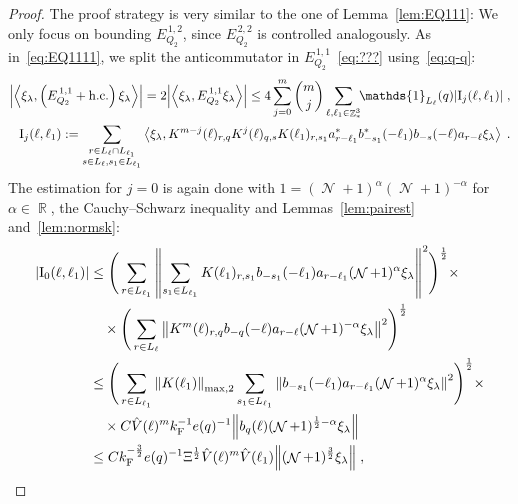 \documentclass[12pt,a4paper]{article}
\numberwithin{equation}{section}
\newcommand{\1}{\mathbb{I}}
\newcommand{\F}{\mathrm{F}}
\newcommand{\I}{\mathrm{I}}
\DeclareMathOperator{\R}{\mathbb{R}}
\DeclareMathOperator{\Z}{\mathbb{Z}}
\DeclareMathOperator{\NN}{\mathcal{N}}
\newcommand{\half}{\frac{1}{2}}
\newcommand{\eva}[1]{\left\langle #1 \right\rangle}
\theoremstyle{plain}
\theoremstyle{definition}
\theoremstyle{remark}
\theoremstyle{plain}
\theoremstyle{definition}
\theoremstyle{remark}
\begin{document}
\begin{proof}
The proof strategy is very similar to the one of Lemma~\ref{lem:EQ111}: We only focus on bounding $ E^{\,1,2}_{Q_2} $, since $ E^{\,2,2}_{Q_2} $ is controlled analogously.
As in~\eqref{eq:EQ1111}, we split the anticommutator in $ E^{\,1,1}_{Q_2} $~\eqref{eq:???} using~\eqref{eq:q-q}:
\begin{equation} \label{eq:EQ2111}
\begin{aligned}
	\abs{\eva{\xi_\lambda,\left(E^{\,1,1}_{Q_2}+\mathrm{h.c.}\right) \xi_\lambda }} 
	= 2\abs{\eva{\xi_\lambda, E^{\,1,1}_{Q_2} \xi_\lambda }}
	\le 4 \sum_{j=0}^m {{m}\choose j} \sum\limits_{\ell,\ell_1  \in \Z^3_*}\!\! \mathds{1}_{L_\ell}(q) |\I_j(\ell, \ell_1)| \;,\\
	\I_j(\ell, \ell_1)
	:= \sum\limits_{\substack{r\in L_{\ell} \cap L_{\ell_1}\\ s \in L_{\ell},s_1\in L_{\ell_1}}}
		\eva{\xi_\lambda, K^{m-j}(\ell)_{r,q} K^{j}(\ell)_{q,s} K(\ell_1)_{r,s_1} a^*_{r-\ell_1} b^*_{-s_1}(-\ell_1) b_{-s}(-\ell) a_{r-\ell} \xi_\lambda} \;. \\
\end{aligned}
\end{equation}
The estimation for $ j = 0 $ is again done with $1 = (\NN+1)^{\alpha}(\NN+1)^{-\alpha}$ for $\alpha \in \R$, the Cauchy--Schwarz inequality and Lemmas~\ref{lem:pairest} and~\ref{lem:normsk}:
\begin{align}
	|\I_0(\ell, \ell_1)|
 	&\leq  \Bigg( \sum\limits_{r \in L_{\ell_1}} \norm{\sum\limits_{s_1 \in L_{\ell_1}} K(\ell_1)_{r,s_1} b_{-s_1}(-\ell_1) a_{r-\ell_1} (\NN+1)^{\alpha}\xi_\lambda}^2\Bigg)^\half \times\nonumber\\
 	&\quad \times \Bigg( \sum\limits_{r \in L_\ell}  \norm{  K^{m}(\ell)_{r,q}  b_{-q}(-\ell) a_{r-\ell} (\NN+1)^{-\alpha}\xi_\lambda }^2\Bigg)^\half \nonumber\\
 	&\leq \Bigg( \sum\limits_{r \in L_{\ell_1}}
 		\norm{K(\ell_1)}_{\mathrm{max,2}} 		
 		\sum\limits_{s_1 \in L_{\ell_1}} \norm{ b_{-s_1}(-\ell_1)  a_{r-\ell_1} (\NN+1)^{\alpha}\xi_\lambda}^2\Bigg)^\half \times\nonumber\\
 	&\quad \times C \hat{V}(\ell)^m k_{\F}^{-1} e(q)^{-1} \norm{b_{q}(\ell) (\NN+1)^{\half-\alpha}\xi_\lambda } \nonumber\\
 	&\leq C k_{\F}^{-\frac 32} e(q)^{-1} \Xi^{\half}
 		\hat{V}(\ell)^m
 		\hat{V}(\ell_1)
 		\norm{ (\NN+1)^{\frac{3}{2}}\xi_\lambda}
 		\;, \label{eq:estEQ2111} 

\end{align}
\end{proof}
\end{document}
